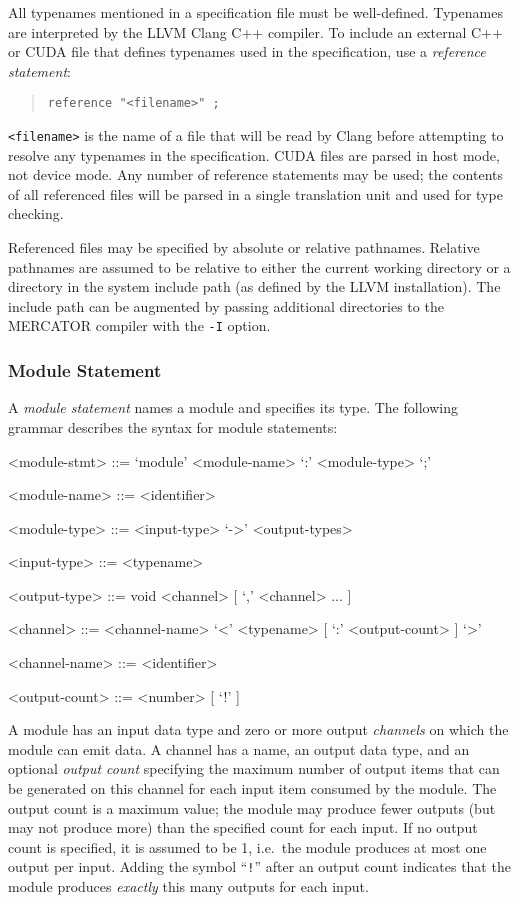 \documentclass[11pt]{article}
\begin{document}
All typenames mentioned in a specification file must be well-defined.
Typenames are interpreted by the LLVM Clang C++ compiler.  To include
an external C++ or CUDA file that defines typenames used in the
specification, use a \textit{reference statement}:
\begin{quote}
\texttt{reference "<filename>" ;}
\end{quote}
\texttt{<filename>} is the name of a file that will be read by Clang before
attempting to resolve any typenames in the specification.  CUDA files
are parsed in host mode, not device mode.  Any number of reference
statements may be used; the contents of all referenced files will be
parsed in a single translation unit and used for type checking.

Referenced files may be specified by absolute or relative pathnames.
Relative pathnames are assumed to be relative to either the current
working directory or a directory in the system include path (as
defined by the LLVM installation).  The include path can be augmented
by passing additional directories to the MERCATOR compiler with
the \texttt{-I} option.

\subsubsection{Module Statement}

A \textit{module statement} names a module and specifies its type.
The following grammar describes the syntax for module statements:
\begin{grammar}

<module-stmt> ::= `module' <module-name> `:' <module-type> `;'

<module-name> ::= <identifier>

<module-type> ::= <input-type> `->' <output-types>

<input-type> ::= <typename>

<output-type> ::= void
\alt <channel> [ `,' <channel> ... ]

<channel> ::= <channel-name> `<' <typename> [ `:' <output-count> ] `>'

<channel-name> ::= <identifier>

<output-count> ::= <number> [ `!' ]

\end{grammar}

A module has an input data type and zero or more output
\emph{channels} on which the module can emit data.  A channel has a
name, an output data type, and an optional \emph{output count}
specifying the maximum number of output items that can be generated on
this channel for each input item consumed by the module.  The output
count is a maximum value; the module may produce fewer outputs (but
may not produce more) than the specified count for each input.  If no
output count is specified, it is assumed to be 1, i.e.\ the module
produces at most one output per input.  Adding the symbol
``\texttt{!}''  after an output count indicates that the module
produces \emph{exactly} this many outputs for each input.
\end{document}

